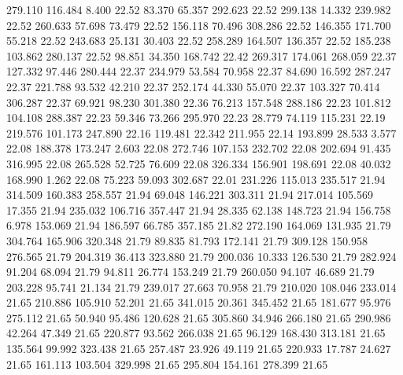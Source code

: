  279.110  116.484    8.400        22.52
  83.370   65.357  292.623        22.52
 299.138   14.332  239.982        22.52
 260.633   57.698   73.479        22.52
 156.118   70.496  308.286        22.52
 146.355  171.700   55.218        22.52
 243.683   25.131   30.403        22.52
 258.289  164.507  136.357        22.52
 185.238  103.862  280.137        22.52
  98.851   34.350  168.742        22.42
 269.317  174.061  268.059        22.37
 127.332   97.446  280.444        22.37
 234.979   53.584   70.958        22.37
  84.690   16.592  287.247        22.37
 221.788   93.532   42.210        22.37
 252.174   44.330   55.070        22.37
 103.327   70.414  306.287        22.37
  69.921   98.230  301.380        22.36
  76.213  157.548  288.186        22.23
 101.812  104.108  288.387        22.23
  59.346   73.266  295.970        22.23
  28.779   74.119  115.231        22.19
 219.576  101.173  247.890        22.16
 119.481   22.342  211.955        22.14
 193.899   28.533    3.577        22.08
 188.378  173.247    2.603        22.08
 272.746  107.153  232.702        22.08
 202.694   91.435  316.995        22.08
 265.528   52.725   76.609        22.08
 326.334  156.901  198.691        22.08
  40.032  168.990    1.262        22.08
  75.223   59.093  302.687        22.01
 231.226  115.013  235.517        21.94
 314.509  160.383  258.557        21.94
  69.048  146.221  303.311        21.94
 217.014  105.569   17.355        21.94
 235.032  106.716  357.447        21.94
  28.335   62.138  148.723        21.94
 156.758    6.978  153.069        21.94
 186.597   66.785  357.185        21.82
 272.190  164.069  131.935        21.79
 304.764  165.906  320.348        21.79
  89.835   81.793  172.141        21.79
 309.128  150.958  276.565        21.79
 204.319   36.413  323.880        21.79
 200.036   10.333  126.530        21.79
 282.924   91.204   68.094        21.79
  94.811   26.774  153.249        21.79
 260.050   94.107   46.689        21.79
 203.228   95.741   21.134        21.79
 239.017   27.663   70.958        21.79
 210.020  108.046  233.014        21.65
 210.886  105.910   52.201        21.65
 341.015   20.361  345.452        21.65
 181.677   95.976  275.112        21.65
  50.940   95.486  120.628        21.65
 305.860   34.946  266.180        21.65
 290.986   42.264   47.349        21.65
 220.877   93.562  266.038        21.65
  96.129  168.430  313.181        21.65
 135.564   99.992  323.438        21.65
 257.487   23.926   49.119        21.65
 220.933   17.787   24.627        21.65
 161.113  103.504  329.998        21.65
 295.804  154.161  278.399        21.65
